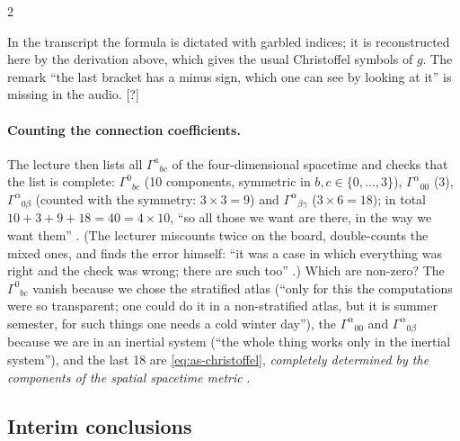 \begin{paracol}{2}
\begin{coursenote}
In the transcript the formula is dictated with garbled indices; it is reconstructed here by the derivation above, which gives the usual Christoffel symbols of $g$. The remark ``the last bracket has a minus sign, which one can see by looking
at it'' is missing in the audio. [?]
\end{coursenote}

\paragraph{Counting the connection coefficients.} The lecture then lists all $\Gamma^a{}_{bc}$ of the four-dimensional spacetime and checks that the list is complete: $\Gamma^0{}_{bc}$ (10 components, symmetric in $b,c\in\{0,\dots,3\}$), $\Gamma^\alpha{}_{00}$ (3), $\Gamma^\alpha{}_{0\beta}$ (counted with the symmetry:
$3\times3=9$) and $\Gamma^\alpha{}_{\beta\gamma}$ ($3\times6=18$); in total $10+3+9+18=40=4\times10$, ``so all those we want are there, in the way we want them'' . (The lecturer miscounts twice on the board, double-counts the mixed ones, and finds the error himself: ``it was a case in which everything was right and the check was wrong; there are such too'' .)
Which are non-zero? The $\Gamma^0{}_{bc}$ vanish because we chose the stratified atlas (``only for this the computations were so transparent; one could do it in a non-stratified atlas, but it is summer semester, for such things one needs a cold winter day''), the $\Gamma^\alpha{}_{00}$ and $\Gamma^\alpha{}_{0\beta}$ because
we are in an inertial system (``the whole thing works only in the inertial system''), and the last 18 are \eqref{eq:as-christoffel}, \emph{completely determined by the components of the spatial spacetime metric} .

\subsection{Interim conclusions}


\end{paracol}
